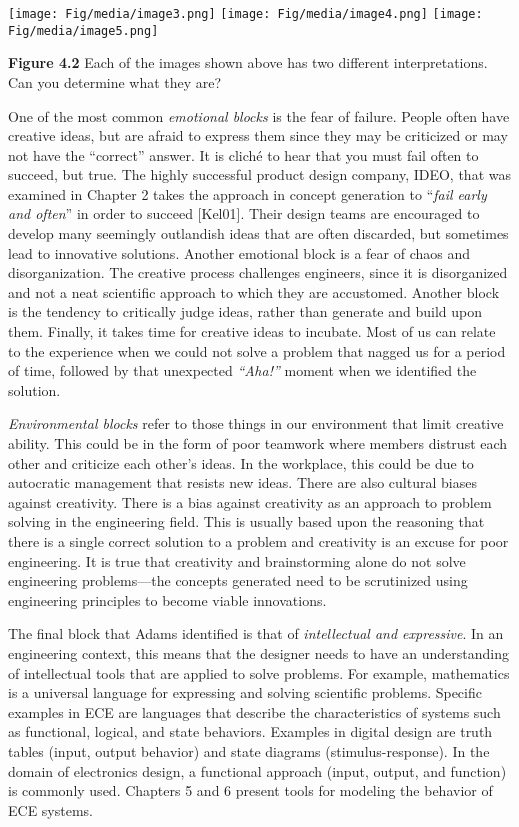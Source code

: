 \texttt{[image: Fig/media/image3.png]}
\texttt{[image: Fig/media/image4.png]}
\texttt{[image: Fig/media/image5.png]}

\textbf{Figure 4.2} Each of the images shown above has two different
interpretations. Can you determine what they are?

One of the most common \emph{emotional blocks} is the fear of failure.
People often have creative ideas, but are afraid to express them since
they may be criticized or may not have the ``correct'' answer. It is
cliché to hear that you must fail often to succeed, but true. The highly
successful product design company, IDEO, that was examined in Chapter 2
takes the approach in con­cept generation to ``\emph{fail early and
often}'' in order to succeed {[}Kel01{]}. Their design teams are
en­couraged to develop many seemingly outlandish ideas that are often
discarded, but some­times lead to innovative solutions. Another emotional
block is a fear of chaos and disorgani­zation. The creative process
challenges engineers, since it is disorganized and not a neat scien­tific
approach to which they are accustomed. Another block is the tendency to
critically judge ideas, rather than generate and build upon them.
Finally, it takes time for creative ideas to incubate. Most of us can
relate to the experience when we could not solve a problem that nagged
us for a period of time, followed by that unexpected \emph{``Aha!''}
moment when we identi­fied the solution.

\emph{Environmental blocks} refer to those things in our environment
that limit creative ability. This could be in the form of poor teamwork
where members distrust each other and criticize each other's ideas. In
the workplace, this could be due to autocratic management that resists
new ideas. There are also cultural biases against creativity. There is a
bias against creativity as an approach to problem solving in the
engineering field. This is usually based upon the reasoning that there
is a single correct solution to a problem and creativity is an excuse
for poor engineering. It is true that creativity and brainstorming alone
do not solve engineering problems---the concepts generated need to be
scrutinized using engineering principles to become viable innovations.

The final block that Adams identified is that of \emph{intellectual and
expressive}. In an engi­neering context, this means that the designer
needs to have an understanding of intellectual tools that are applied to
solve problems. For example, mathematics is a universal language for
expressing and solving scientific problems. Specific examples in ECE are
languages that de­scribe the characteristics of systems such as
functional, logical, and state behaviors. Examples in digital design are
truth tables (input, output behavior) and state diagrams
(stimulus-response). In the domain of electronics design, a functional
approach (input, output, and function) is commonly used. Chapters 5 and
6 present tools for modeling the behavior of ECE systems.

